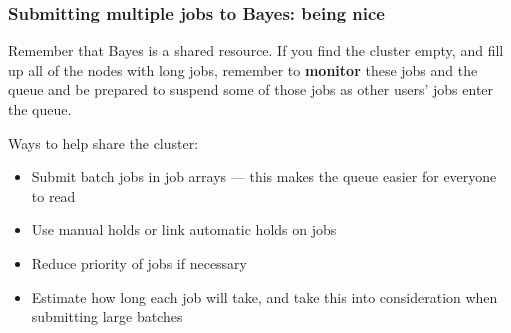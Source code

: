 \documentclass[12pt, 
hyperref={colorlinks=true, linkcolor=blue, urlcolor=cyan}]{beamer}
\newcommand{\myframe}[1]{\begin{frame} \frametitle{#1}}
\begin{document}
\myframe{Submitting multiple jobs to Bayes: being nice}
Remember that Bayes is a shared resource. If you find the cluster empty, and fill up all of the nodes with long jobs, remember to \textbf{monitor} these jobs and the queue and be prepared to suspend some of those jobs as other users' jobs enter the queue.

Ways to help share the cluster:
\begin{itemize}
\item Submit batch jobs in job arrays --- this makes the queue easier for everyone to read
\item Use manual holds or link automatic holds on jobs
\item Reduce priority of jobs if necessary
\item Estimate how long each job will take, and take this into consideration when submitting large batches
\end{itemize}
\end{frame}
\end{document}
